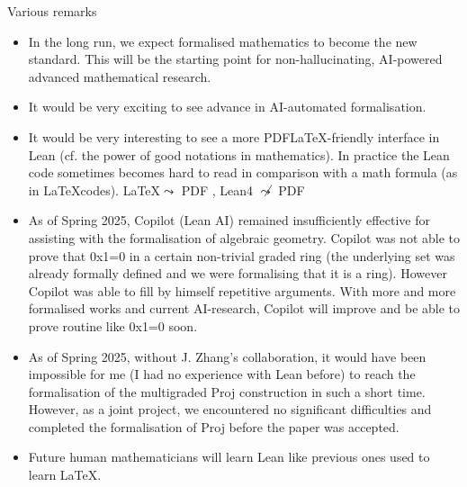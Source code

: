 \documentclass[9pt]{beamer}
\begin{document}
\begin{frame}{Various remarks}
\begin{itemize}

  
  \item In the long run, we expect formalised mathematics to become the new standard. This will be the starting point for non-hallucinating, AI-powered advanced mathematical research.
  
  \item It would be very exciting to see advance in AI-automated formalisation.
  
  \item It would be very interesting to see a more PDF\LaTeX-friendly interface  in Lean (cf. the power of good notations in mathematics). In practice the Lean code sometimes becomes hard to read in comparison with a math formula (as in \LaTeX codes).
     \LaTeX $\leadsto$ PDF  ,      Lean4 $\not \leadsto$ PDF 
  
  \item As of Spring 2025, Copilot (Lean AI) remained insufficiently effective for assisting with the formalisation of algebraic geometry. Copilot was not able to prove that 0x1=0 in a certain non-trivial graded ring (the underlying set was already formally defined and we were formalising that it is a ring). However Copilot was able to fill by himself repetitive arguments. With more and more formalised works and current AI-research, Copilot will improve and be able to prove routine like 0x1=0 soon. 
  
  \item As of Spring 2025, without J. Zhang's collaboration, it would have been impossible for me (I had no experience with Lean before) to reach the formalisation of the multigraded Proj construction in such a short time. However, as a joint project, we encountered no significant difficulties and completed the formalisation of Proj before the paper was accepted.
  
  \item Future human mathematicians will learn Lean like previous ones used to learn \LaTeX. 
\end{itemize}


\end{frame}
\end{document}
